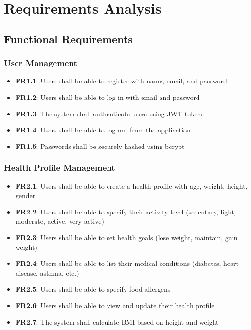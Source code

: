 \chapter{Requirements Analysis}

\section{Functional Requirements}

\subsection{User Management}

\begin{itemize}
    \item \textbf{FR1.1}: Users shall be able to register with name, email, and password
    \item \textbf{FR1.2}: Users shall be able to log in with email and password
    \item \textbf{FR1.3}: The system shall authenticate users using JWT tokens
    \item \textbf{FR1.4}: Users shall be able to log out from the application
    \item \textbf{FR1.5}: Passwords shall be securely hashed using bcrypt
\end{itemize}

\subsection{Health Profile Management}

\begin{itemize}
    \item \textbf{FR2.1}: Users shall be able to create a health profile with age, weight, height, gender
    \item \textbf{FR2.2}: Users shall be able to specify their activity level (sedentary, light, moderate, active, very active)
    \item \textbf{FR2.3}: Users shall be able to set health goals (lose weight, maintain, gain weight)
    \item \textbf{FR2.4}: Users shall be able to list their medical conditions (diabetes, heart disease, asthma, etc.)
    \item \textbf{FR2.5}: Users shall be able to specify food allergens
    \item \textbf{FR2.6}: Users shall be able to view and update their health profile
    \item \textbf{FR2.7}: The system shall calculate BMI based on height and weight
\end{itemize}

